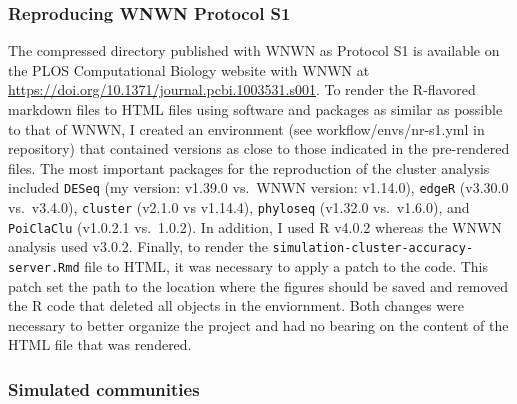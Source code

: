 \documentclass[
]{article}
\begin{document}
\hypertarget{reproducing-wnwn-protocol-s1}{%
\subsubsection{Reproducing WNWN Protocol
S1}\label{reproducing-wnwn-protocol-s1}}

The compressed directory published with WNWN as Protocol S1 is available
on the PLOS Computational Biology website with WNWN at
\url{https://doi.org/10.1371/journal.pcbi.1003531.s001}. To render the
R-flavored markdown files to HTML files using software and packages as
similar as possible to that of WNWN, I created an environment (see
workflow/envs/nr-s1.yml in repository) that contained versions as close
to those indicated in the pre-rendered files. The most important
packages for the reproduction of the cluster analysis included
\texttt{DESeq} (my version: v1.39.0 vs.~WNWN version: v1.14.0),
\texttt{edgeR} (v3.30.0 vs.~v3.4.0), \texttt{cluster} (v2.1.0 vs
v1.14.4), \texttt{phyloseq} (v1.32.0 vs.~v1.6.0), and \texttt{PoiClaClu}
(v1.0.2.1 vs.~1.0.2). In addition, I used R v4.0.2 whereas the WNWN
analysis used v3.0.2. Finally, to render the
\texttt{simulation-cluster-accuracy-server.Rmd} file to HTML, it was
necessary to apply a patch to the code. This patch set the path to the
location where the figures should be saved and removed the R code that
deleted all objects in the enviornment. Both changes were necessary to
better organize the project and had no bearing on the content of the
HTML file that was rendered.

\hypertarget{simulated-communities}{%
\subsubsection{Simulated communities}\label{simulated-communities}}
\end{document}
